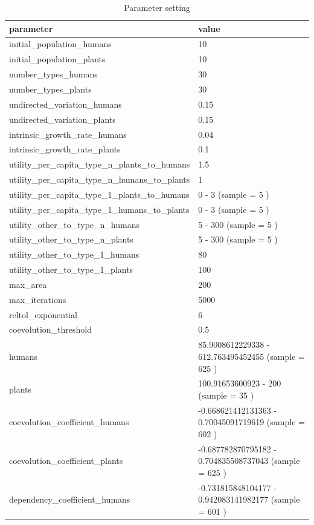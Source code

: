 \documentclass[
]{book}
\begin{document}
\begin{table}[!h]

\caption{\label{tab:4UbnmU1tablepdf}Parameter setting}
\centering
\begin{tabular}[t]{l|l}
\hline
parameter & value\\
\hline
initial\_population\_humans & 10\\
\hline
initial\_population\_plants & 10\\
\hline
number\_types\_humans & 30\\
\hline
number\_types\_plants & 30\\
\hline
undirected\_variation\_humans & 0.15\\
\hline
undirected\_variation\_plants & 0.15\\
\hline
intrinsic\_growth\_rate\_humans & 0.04\\
\hline
intrinsic\_growth\_rate\_plants & 0.1\\
\hline
utility\_per\_capita\_type\_n\_plants\_to\_humans & 1.5\\
\hline
utility\_per\_capita\_type\_n\_humans\_to\_plants & 1\\
\hline
utility\_per\_capita\_type\_1\_plants\_to\_humans & 0 - 3 (sample = 5 )\\
\hline
utility\_per\_capita\_type\_1\_humans\_to\_plants & 0 - 3 (sample = 5 )\\
\hline
utility\_other\_to\_type\_n\_humans & 5 - 300 (sample = 5 )\\
\hline
utility\_other\_to\_type\_n\_plants & 5 - 300 (sample = 5 )\\
\hline
utility\_other\_to\_type\_1\_humans & 80\\
\hline
utility\_other\_to\_type\_1\_plants & 100\\
\hline
max\_area & 200\\
\hline
max\_iterations & 5000\\
\hline
reltol\_exponential & 6\\
\hline
coevolution\_threshold & 0.5\\
\hline
humans & 85.9008612229338 - 612.763495452455 (sample = 625 )\\
\hline
plants & 100.91653600923 - 200 (sample = 35 )\\
\hline
coevolution\_coefficient\_humans & -0.668621412131363 - 0.70045091719619 (sample = 602 )\\
\hline
coevolution\_coefficient\_plants & -0.687782870795182 - 0.704835508737043 (sample = 625 )\\
\hline
dependency\_coefficient\_humans & -0.731815848104177 - 0.942083141982177 (sample = 601 )\\

\end{tabular}
\end{table}
\end{document}
